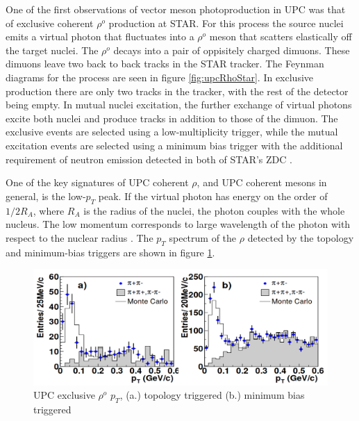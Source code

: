 One of the first observations of vector meson photoproduction in UPC was that of exclusive coherent $\rho^o$ production at STAR. For this process the source nuclei emits a virtual photon that fluctuates into a $\rho^o$ meson that scatters elastically off the target nuclei. The $\rho^o$ decays into a pair of oppisitely charged dimuons. These dimuons leave two back to back tracks in the STAR tracker. The Feynman diagrams for the process are seen in figure \ref{fig:upcRhoStar}. In exclusive production there are only two tracks in the tracker, with the rest of the detector being empty. In mutual nuclei excitation, the further exchange of virtual photons excite both nuclei and produce tracks in addition to those of the dimuon. The exclusive events are selected using a low-multiplicity trigger, while the mutual excitation events are selected using a minimum bias trigger with the additional requirement of neutron emission detected in both of STAR's ZDC \cite{Adler:2002sc}. 

One of the key signatures of UPC coherent $\rho$, and UPC coherent mesons in general, is the low-$p_T$ peak. If the virtual photon has energy on the order of $1/2R_{A}$, where $R_{A}$ is the radius of the nuclei, the photon couples with the whole nucleus. The low momentum corresponds to large wavelength of the photon with respect to the nuclear radius \cite{Guzey:2013taa}\cite{Frankfurt:2006wg}\cite{Baltz:2002pp}\cite{Klein:2003vd}. The $p_T$ spectrum of the $\rho$ detected by the topology and minimum-bias triggers are shown in figure \ref{fig:upcRhoStarPt}.

\begin{figure}[h!]
\begin{centering}
\includegraphics[width=5.5in]{Chapter2/importfigs/rho_upc_pt_star.png}
\par\end{centering}
\caption{UPC exclusive $\rho^o$ $p_T$, (a.) topology triggered (b.) minimum bias triggered \cite{Adler:2002sc} \label{fig:upcRhoStarPt}}
\end{figure}

